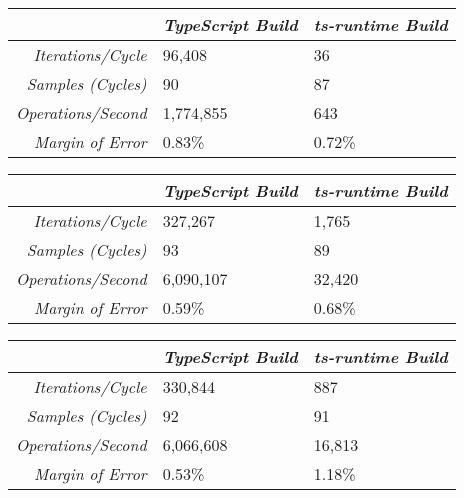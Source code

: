 \begin{center}
{
\centering
\tabulinesep=1.2mm
\setlength{\tabcolsep}{5mm}
\def\arraystretch{1.25}
\small
\begin{tabu} to \textwidth {|r||X[c,m]|X[c,m]|}
  \hline
  & \emph{TypeScript Build} & \emph{ts-runtime Build} \\
  \hline
  \hline
  \emph{Iterations/Cycle}  & 96,408 & 36 \\
  \hline
  \emph{Samples (Cycles)}  & 90 & 87 \\
  \hline
  \emph{Operations/Second} & 1,774,855 & 643 \\
  \hline
  \emph{Margin of Error}   & 0.83\% & 0.72\% \\
  \hline
\end{tabu}
}
\end{center}

\begin{center}
{
\centering
\tabulinesep=1.2mm
\setlength{\tabcolsep}{5mm}
\def\arraystretch{1.25}
\small
\begin{tabu} to \textwidth {|r||X[c,m]|X[c,m]|}
  \hline
  & \emph{TypeScript Build} & \emph{ts-runtime Build} \\
  \hline
  \hline
  \emph{Iterations/Cycle}  & 327,267 & 1,765 \\
  \hline
  \emph{Samples (Cycles)}  & 93 & 89 \\
  \hline
  \emph{Operations/Second} & 6,090,107 & 32,420 \\
  \hline
  \emph{Margin of Error}   & 0.59\% & 0.68\% \\
  \hline
\end{tabu}
}
\end{center}

\begin{center}
{
\centering
\tabulinesep=1.2mm
\setlength{\tabcolsep}{5mm}
\def\arraystretch{1.25}
\small
\begin{tabu} to \textwidth {|r||X[c,m]|X[c,m]|}
  \hline
  & \emph{TypeScript Build} & \emph{ts-runtime Build} \\
  \hline
  \hline
  \emph{Iterations/Cycle}  & 330,844 & 887 \\
  \hline
  \emph{Samples (Cycles)}  & 92 & 91 \\
  \hline
  \emph{Operations/Second} & 6,066,608 & 16,813 \\
  \hline
  \emph{Margin of Error}   & 0.53\% & 1.18\% \\
  \hline
\end{tabu}
}
\end{center}

